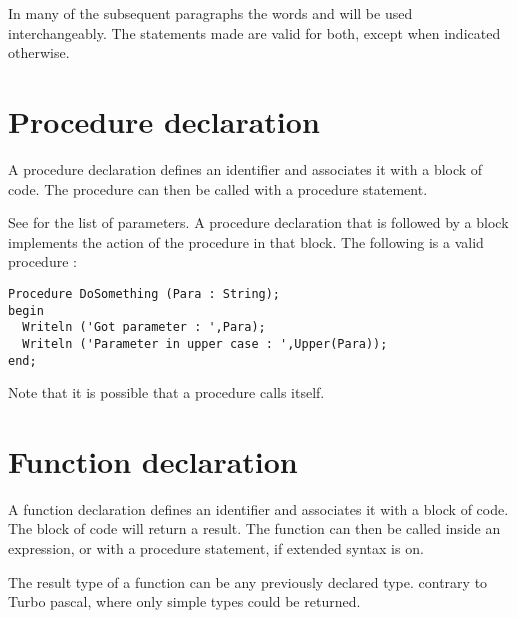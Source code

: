 \begin{remark} In many of the subsequent paragraphs the words 
and  will be used interchangeably. The statements made are
valid for both, except when indicated otherwise.
\end{remark}

\section{Procedure declaration}
A procedure declaration defines an identifier and associates it with a
block of code. The procedure can then be called with a procedure statement.

See  for the list of parameters.
A procedure declaration that is followed by a block implements the action of
the procedure in that block.
The following is a valid procedure :
\begin{verbatim}
Procedure DoSomething (Para : String);
begin
  Writeln ('Got parameter : ',Para);
  Writeln ('Parameter in upper case : ',Upper(Para));
end;
\end{verbatim}
Note that it is possible that a procedure calls itself.

\section{Function declaration}
A function declaration defines an identifier and associates it with a
block of code. The block of code will return a result.
The function can then be called inside an expression, or with a procedure
statement, if extended syntax is on.

The result type of a function can be any previously declared type.
contrary to Turbo pascal, where only simple types could be returned.


